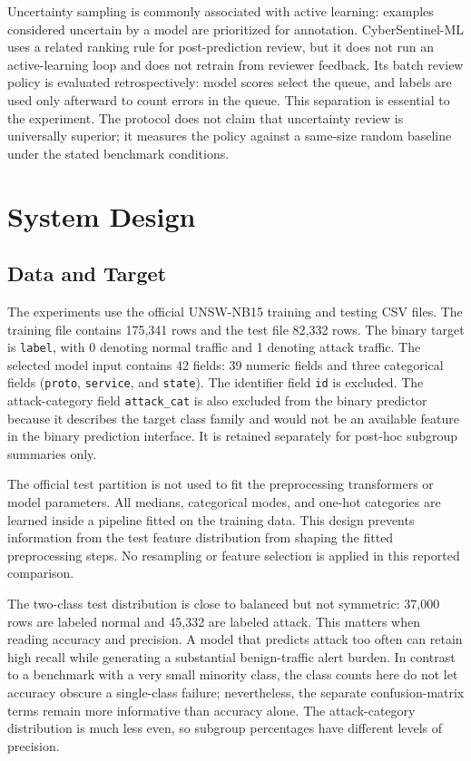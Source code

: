 \documentclass[conference]{IEEEtran}
\begin{document}
Uncertainty sampling is commonly associated with active learning: examples considered uncertain by a model are prioritized for annotation. CyberSentinel-ML uses a related ranking rule for post-prediction review, but it does not run an active-learning loop and does not retrain from reviewer feedback. Its batch review policy is evaluated retrospectively: model scores select the queue, and labels are used only afterward to count errors in the queue. This separation is essential to the experiment. The protocol does not claim that uncertainty review is universally superior; it measures the policy against a same-size random baseline under the stated benchmark conditions.

\section{System Design}
\subsection{Data and Target}
The experiments use the official UNSW-NB15 training and testing CSV files. The training file contains 175,341 rows and the test file 82,332 rows. The binary target is \texttt{label}, with 0 denoting normal traffic and 1 denoting attack traffic. The selected model input contains 42 fields: 39 numeric fields and three categorical fields (\texttt{proto}, \texttt{service}, and \texttt{state}). The identifier field \texttt{id} is excluded. The attack-category field \texttt{attack\_cat} is also excluded from the binary predictor because it describes the target class family and would not be an available feature in the binary prediction interface. It is retained separately for post-hoc subgroup summaries only.

The official test partition is not used to fit the preprocessing transformers or model parameters. All medians, categorical modes, and one-hot categories are learned inside a pipeline fitted on the training data. This design prevents information from the test feature distribution from shaping the fitted preprocessing steps. No resampling or feature selection is applied in this reported comparison.

The two-class test distribution is close to balanced but not symmetric: 37,000 rows are labeled normal and 45,332 are labeled attack. This matters when reading accuracy and precision. A model that predicts attack too often can retain high recall while generating a substantial benign-traffic alert burden. In contrast to a benchmark with a very small minority class, the class counts here do not let accuracy obscure a single-class failure; nevertheless, the separate confusion-matrix terms remain more informative than accuracy alone. The attack-category distribution is much less even, so subgroup percentages have different levels of precision.
\end{document}
